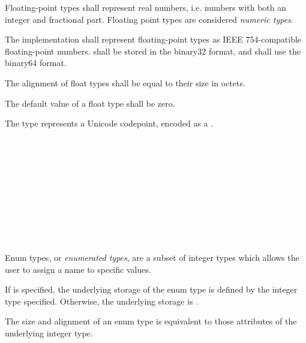 \specsubsubitem
Floating-point types shall represent real numbers, i.e. numbers with both an
integer and fractional part. Floating point types are considered \textit{numeric
types}.

\specsubsubitem
The implementation shall represent floating-point types as IEEE 754-compatible
floating-point numbers.  shall be stored in the binary32 format,
and  shall use the binary64 format.

\specsubsubitem
The alignment of float types shall be equal to their size in octets.

\specsubsubitem
The default value of a float type shall be zero.


\specsubsubitem
The  type represents a Unicode codepoint, encoded as a
.


\begin{grammar}
 \\
	 \terminal{\{}  \terminal{\}} \\
	  \terminal{\{}  \terminal{\}} \\

 \\
	 \optional{\terminal{,}} \\
	 \terminal{,}  \\

 \\
	 \\
	 \terminal{=}  \\
\end{grammar}

\specsubsubitem
Enum types, or \textit{enumerated types}, are a subset of integer types which
allows the user to assign a name to specific values.

\specsubsubitem
If  is specified, the underlying storage of the enum
type is defined by the integer type specified. Otherwise, the underlying storage
is .

\specsubsubitem
The size and alignment of an enum type is equivalent to those attributes of the
underlying integer type.

